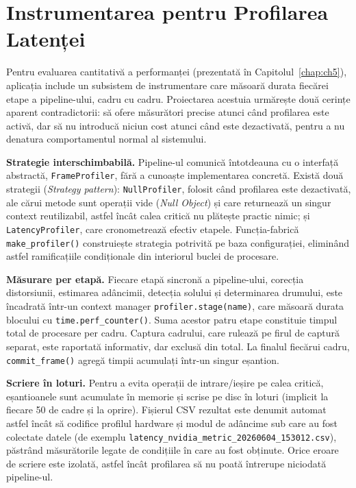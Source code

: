 \section{Instrumentarea pentru Profilarea Latenței}
\label{sec:profiling}

Pentru evaluarea cantitativă a performanței (prezentată în Capitolul~\ref{chap:ch5}), aplicația include un subsistem de instrumentare care măsoară durata fiecărei etape a pipeline-ului, cadru cu cadru. Proiectarea acestuia urmărește două cerințe aparent contradictorii: să ofere măsurători precise atunci când profilarea este activă, dar să nu introducă niciun cost atunci când este dezactivată, pentru a nu denatura comportamentul normal al sistemului.

\textbf{Strategie interschimbabilă.} Pipeline-ul comunică întotdeauna cu o interfață abstractă, \texttt{FrameProfiler}, fără a cunoaște implementarea concretă. Există două strategii (\textit{Strategy pattern}): \texttt{NullProfiler}, folosit când profilarea este dezactivată, ale cărui metode sunt operații vide (\textit{Null Object}) și care returnează un singur context reutilizabil, astfel încât calea critică nu plătește practic nimic; și \texttt{LatencyProfiler}, care cronometrează efectiv etapele. Funcția-fabrică \texttt{make\_profiler()} construiește strategia potrivită pe baza configurației, eliminând astfel ramificațiile condiționale din interiorul buclei de procesare.

\textbf{Măsurare per etapă.} Fiecare etapă sincronă a pipeline-ului, corecția distorsiunii, estimarea adâncimii, detecția solului și determinarea drumului, este încadrată într-un context manager \texttt{profiler.stage(name)}, care măsoară durata blocului cu \texttt{time.perf\_counter()}. Suma acestor patru etape constituie timpul total de procesare per cadru. Captura cadrului, care rulează pe firul de captură separat, este raportată informativ, dar exclusă din total. La finalul fiecărui cadru, \texttt{commit\_frame()} agregă timpii acumulați într-un singur eșantion.

\textbf{Scriere în loturi.} Pentru a evita operații de intrare/ieșire pe calea critică, eșantioanele sunt acumulate în memorie și scrise pe disc în loturi (implicit la fiecare 50 de cadre și la oprire). Fișierul CSV rezultat este denumit automat astfel încât să codifice profilul hardware și modul de adâncime sub care au fost colectate datele (de exemplu \texttt{latency\_nvidia\_metric\_20260604\_153012.csv}), păstrând măsurătorile legate de condițiile în care au fost obținute. Orice eroare de scriere este izolată, astfel încât profilarea să nu poată întrerupe niciodată pipeline-ul.

